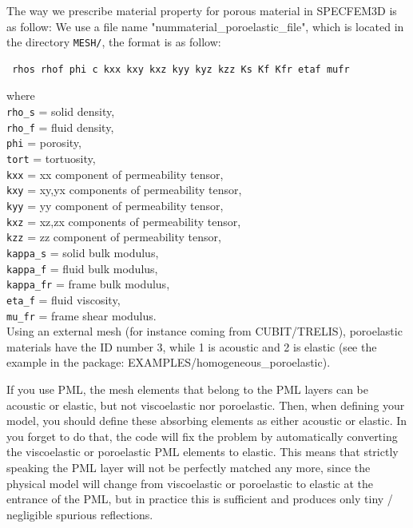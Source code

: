 The way we prescribe material property for porous material in SPECFEM3D is as follow:
We use a file name "nummaterial\_poroelastic\_file", which is located in the directory \texttt{MESH/}, the format is as follow:
\begin{verbatim}
 rhos rhof phi c kxx kxy kxz kyy kyz kzz Ks Kf Kfr etaf mufr
\end{verbatim}
where\\
\texttt{rho\_s} = solid density,\\
\texttt{rho\_f} = fluid density,\\
\texttt{phi} = porosity,\\
\texttt{tort} = tortuosity,\\
\texttt{kxx} = xx component of permeability tensor,\\
\texttt{kxy} = xy,yx components of permeability tensor,\\
\texttt{kyy} = yy component of permeability tensor,\\
\texttt{kxz} = xz,zx components of permeability tensor,\\
\texttt{kzz} = zz component of permeability tensor,\\
\texttt{kappa\_s} = solid bulk modulus,\\
\texttt{kappa\_f} = fluid bulk modulus,\\
\texttt{kappa\_fr} = frame bulk modulus,\\
\texttt{eta\_f} = fluid viscosity,\\
\texttt{mu\_fr} = frame shear modulus.\\

Using an external mesh (for instance coming from CUBIT/TRELIS), poroelastic materials have the ID number 3, while 1 is acoustic and 2 is elastic (see the example in the package: EXAMPLES/homogeneous\_poroelastic).



If you use PML, the mesh elements that belong to the PML layers can
be acoustic or elastic, but not viscoelastic nor poroelastic. Then,
when defining your model, you should define these absorbing elements
as either acoustic or elastic. In you forget to do that, the code
will fix the problem by automatically converting the viscoelastic
or poroelastic PML elements to elastic. This means that strictly speaking
the PML layer will not be perfectly matched any more, since the physical
model will change from viscoelastic or poroelastic to elastic at the
entrance of the PML, but in practice this is sufficient and produces
only tiny / negligible spurious reflections.

